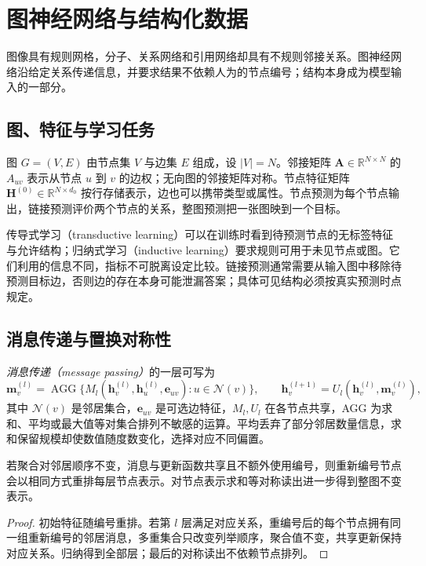 \setcounter{chapter}{21} %
\chapter{图神经网络与结构化数据}
\label{chap:dl-gnn}
图像具有规则网格，分子、关系网络和引用网络却具有不规则邻接关系。图神经网络沿给定关系传递信息，并要求结果不依赖人为的节点编号；结构本身成为模型输入的一部分。

\section{图、特征与学习任务}
图 $G=(V,E)$ 由节点集 $V$ 与边集 $E$ 组成，设 $|V|=N$。邻接矩阵 $\mathbf A\in\mathbb R^{N\times N}$ 的 $A_{uv}$ 表示从节点 $u$ 到 $v$ 的边权；无向图的邻接矩阵对称。节点特征矩阵 $\mathbf H^{(0)}\in\mathbb R^{N\times d_0}$ 按行存储表示，边也可以携带类型或属性。节点预测为每个节点输出，链接预测评价两个节点的关系，整图预测把一张图映到一个目标。

传导式学习（transductive learning）可以在训练时看到待预测节点的无标签特征与允许结构；归纳式学习（inductive learning）要求规则可用于未见节点或图。它们利用的信息不同，指标不可脱离设定比较。链接预测通常需要从输入图中移除待预测目标边，否则边的存在本身可能泄漏答案；具体可见结构必须按真实预测时点规定。

\section{消息传递与置换对称性}
\emph{消息传递（message passing）}的一层可写为
\[
\mathbf m_v^{(l)}=\operatorname{AGG}\{M_l(\mathbf h_v^{(l)},\mathbf h_u^{(l)},\mathbf e_{uv}):u\in\mathcal N(v)\},\qquad
\mathbf h_v^{(l+1)}=U_l(\mathbf h_v^{(l)},\mathbf m_v^{(l)}),
\]
其中 $\mathcal N(v)$ 是邻居集合，$\mathbf e_{uv}$ 是可选边特征，$M_l,U_l$ 在各节点共享，AGG 为求和、平均或最大值等对集合排列不敏感的运算。平均丢弃了部分邻居数量信息，求和保留规模却使数值随度数变化，选择对应不同偏置。

\begin{proposition}[消息传递的置换性质]
若聚合对邻居顺序不变，消息与更新函数共享且不额外使用编号，则重新编号节点会以相同方式重排每层节点表示。对节点表示求和等对称读出进一步得到整图不变表示。
\end{proposition}
\begin{proof}
初始特征随编号重排。若第 $l$ 层满足对应关系，重编号后的每个节点拥有同一组重新编号的邻居消息，多重集合只改变列举顺序，聚合值不变，共享更新保持对应关系。归纳得到全部层；最后的对称读出不依赖节点排列。
\end{proof}

